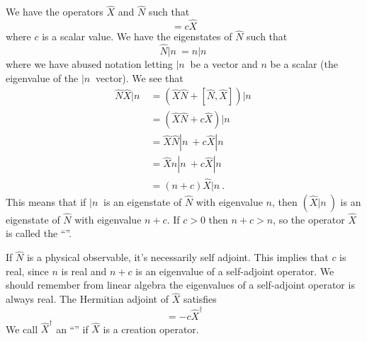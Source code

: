 We have the operators $\widehat{X}$ and $\widehat{N}$ such that
\begin{equation}%
[\widehat{N},\widehat{X}]=c\widehat{X}
\end{equation}
where $c$ is a scalar value. We have the eigenstates of
$\widehat{N}$ such that
\begin{equation}%
\widehat{N}|n\> = n|n\>
\end{equation}
where we have abused notation letting $|n\>$ be a vector and $n$
be a scalar (the eigenvalue of the $|n\>$ vector). We see that
\begin{subequations}
\begin{align}
\widehat{N}\widehat{X}|n\> &= \left(\widehat{X}\widehat{N}+[\widehat{N},\widehat{X}]\right)|n\>\\
&=\left(\widehat{X}\widehat{N}+c\widehat{X}\right)|n\>\\
&=\widehat{X}\widehat{N}|n\>+c\widehat{X}|n\>\\
&=\widehat{X}n|n\>+c\widehat{X}|n\>\\
&=(n+c)\widehat{X}|n\>.
\end{align}
\end{subequations}
This means that if $|n\>$ is an eigenstate of $\widehat{N}$ with
eigenvalue $n$, then $(\widehat{X}|n\>)$ is an eigenstate of
$\widehat{N}$ with eigenvalue $n+c$. If $c>0$ then $n+c>n$, so
the operator $\widehat{X}$ is called the ``''. 

If $\widehat{N}$ is a physical observable, it's necessarily self
adjoint. This implies that $c$ is real, since $n$ is real and
$n+c$ is an eigenvalue of a self-adjoint operator. We should
remember from linear algebra the eigenvalues of a self-adjoint
operator is always real. The Hermitian adjoint of $\widehat{X}$
satisfies
\begin{equation}%
[\widehat{N},\widehat{X}^{\dag}]=-c\widehat{X}^{\dag}
\end{equation}
We call $\widehat{X}^\dag$ an ``''
if $\widehat{X}$ is a creation operator.

